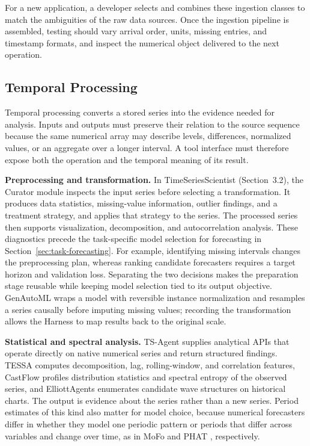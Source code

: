 \documentclass[preprints,article,submit,moreauthors]{Definitions/mdpi}
\begin{document}
For a new application, a developer selects and combines these ingestion classes to match the ambiguities of the raw data sources. Once the ingestion pipeline is assembled, testing should vary arrival order, units, missing entries, and timestamp formats, and inspect the numerical object delivered to the next operation.

\subsection{Temporal Processing}
\label{sec:temporal-processing}

Temporal processing converts a stored series into the evidence needed for analysis. Inputs and outputs must preserve their relation to the source sequence because the same numerical array may describe levels, differences, normalized values, or an aggregate over a longer interval. A tool interface must therefore expose both the operation and the temporal meaning of its result.

\noindent\textbf{Preprocessing and transformation.} In TimeSeriesScientist \citep{timeseriesscientist2025} (Section~3.2), the Curator module inspects the input series before selecting a transformation. It produces data statistics, missing-value information, outlier findings, and a treatment strategy, and applies that strategy to the series.
The processed series then supports visualization, decomposition, and autocorrelation analysis. These diagnostics precede the task-specific model selection for forecasting in Section~\ref{sec:task-forecasting}. For example, identifying missing intervals changes the preprocessing plan, whereas ranking candidate forecasters requires a target horizon and validation loss. Separating the two decisions makes the preparation stage reusable while keeping model selection tied to its output objective. GenAutoML \citep{genautoml2026} wraps a model with reversible instance normalization and resamples a series causally before imputing missing values; recording the transformation allows the Harness to map results back to the original scale.

\noindent\textbf{Statistical and spectral analysis.} TS-Agent \citep{tsagent2025} supplies analytical APIs that operate directly on native numerical series and return structured findings. TESSA \citep{tessa2024} computes decomposition, lag, rolling-window, and correlation features, CastFlow \citep{castflow2026} profiles distribution statistics and spectral entropy of the observed series, and ElliottAgents \citep{elliottagents2025} enumerates candidate wave structures on historical charts. The output is evidence about the series rather than a new series. Period estimates of this kind also matter for model choice, because numerical forecasters differ in whether they model one periodic pattern or periods that differ across variables and change over time, as in MoFo \citep{ma2025mofo} and PHAT \citep{ma2026phat}, respectively.
\end{document}
